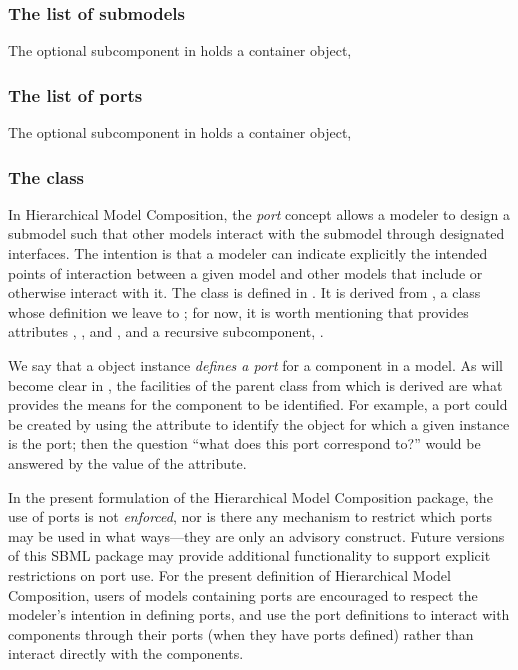 \subsubsection{The list of submodels}

The optional  subcomponent in \Model holds a \ListOfSubmodels container object, 


\subsubsection{The list of ports}

The optional  subcomponent in \Model holds a \ListOfPorts container object, 


\subsubsection{The  class}
\label{port-class}

In Hierarchical Model Composition, the \emph{port} concept allows a modeler to design a submodel such that other models interact with the submodel through designated interfaces.  The intention is that a modeler can indicate explicitly the intended points of interaction between a given model and other models that include or otherwise interact with it. The \Port class is defined in .  It is derived from \SBaseRef, a class whose definition we leave to ; for now, it is worth mentioning that \SBaseRef provides attributes , ,  and , and a recursive subcomponent, .

\clearpage

We say that a \Port object instance \emph{defines a port} for a component in a model.  As will become clear in , the facilities of the \SBaseRef parent class from which \Port is derived are what provides the means for the component to be identified.  For example, a port could be created by using the  attribute to identify the object for which a given \Port instance is the port; then the question ``what does this port correspond to?'' would be answered by the value of the  attribute.

In the present formulation of the Hierarchical Model Composition package, the use of ports is not \emph{enforced}, nor is there any mechanism to restrict which ports may be used in what ways---they are only an advisory construct.  Future versions of this SBML package may provide additional functionality to support explicit restrictions on port use.  For the present definition of Hierarchical Model Composition, users of models containing ports are encouraged to respect the modeler's intention in defining ports, and use the port definitions to interact with components through their ports (when they have ports defined) rather than interact directly with the components.

